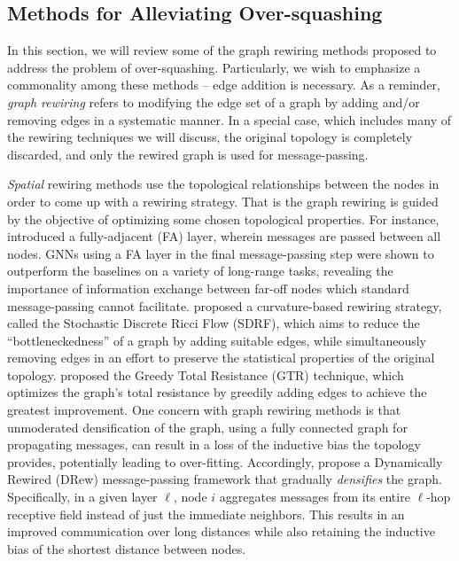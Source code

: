 \subsection{Methods for Alleviating Over-squashing}

In this section, we will review some of the graph rewiring methods proposed to address the problem of over-squashing. Particularly, we wish to emphasize a commonality among these methods -- edge addition is necessary. %
As a reminder, \textit{graph rewiring} refers to modifying the edge set of a graph by adding and/or removing edges in a systematic manner. In a special case, which includes many of the rewiring techniques we will discuss, the original topology is completely discarded, and only the rewired graph is used for message-passing.

\textit{Spatial} rewiring methods use the topological relationships between the nodes in order to come up with a rewiring strategy. That is the graph rewiring is guided by the objective of optimizing some chosen topological properties. For instance, \citet{alon2021on} introduced a fully-adjacent (FA) layer, wherein messages are passed between all nodes. GNNs using a FA layer in the final message-passing step were shown to outperform the baselines on a variety of long-range tasks, revealing the importance of information exchange between far-off nodes which standard message-passing cannot facilitate. \citet{topping2022understanding} proposed a curvature-based rewiring strategy, called the Stochastic Discrete Ricci Flow (SDRF), which aims to reduce the ``bottleneckedness'' of a graph by adding suitable edges, while simultaneously removing edges in an effort to preserve the statistical properties of the original topology. \citet{black2023resistance} proposed the Greedy Total Resistance (GTR) technique, which optimizes the graph's total resistance by greedily adding edges to achieve the greatest improvement. One concern with graph rewiring methods is that unmoderated densification of the graph, \eg using a fully connected graph for propagating messages, can result in a loss of the inductive bias the topology provides, potentially leading to over-fitting. Accordingly, \citet{gutteridge2023drew} propose a Dynamically Rewired (DRew) message-passing framework that gradually \textit{densifies} the graph. Specifically, in a given layer $\ell$, node $i$ aggregates messages from its entire $\ell$-hop receptive field instead of just the immediate neighbors. This results in an improved communication over long distances while also retaining the inductive bias of the shortest distance between nodes.

